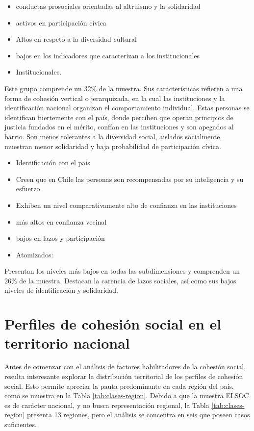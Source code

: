 \documentclass[
  12pt,
]{book}
\begin{document}
\begin{itemize}
\item
  conductas prosociales orientadas al altruismo y la solidaridad
\item
  activos en participación cívica
\item
  Altos en respeto a la diversidad cultural
\item
  bajos en los indicadores que caracterizan a los institucionales
\item
  Institucionales.
\end{itemize}

Este grupo comprende un 32\% de la muestra. Sus características refieren a una forma de cohesión vertical o jerarquizada, en la cual las instituciones y la identificación nacional organizan el comportamiento individual. Estas personas se identifican fuertemente con el país, donde perciben que operan principios de justicia fundados en el mérito, confían en las instituciones y son apegados al barrio. Son menos tolerantes a la diversidad social, aislados socialmente, muestran menor solidaridad y baja probabilidad de participación cívica.

\begin{itemize}
\item
  Identificación con el país
\item
  Creen que en Chile las personas son recompensadas por su inteligencia y su esfuerzo
\item
  Exhiben un nivel comparativamente alto de confianza en las instituciones
\item
  más altos en confianza vecinal
\item
  bajos en lazos y participación
\item
  Atomizados:
\end{itemize}

Presentan los niveles más bajos en todas las subdimensiones y comprenden un 26\% de la muestra. Destacan la carencia de lazos sociales, así como sus bajos niveles de identificación y solidaridad.

\hypertarget{perfiles-de-cohesiuxf3n-social-en-el-territorio-nacional}{%
\section{Perfiles de cohesión social en el territorio nacional}\label{perfiles-de-cohesiuxf3n-social-en-el-territorio-nacional}}

Antes de comenzar con el análisis de factores habilitadores de la cohesión social, resulta interesante explorar la distribución territorial de los perfiles de cohesión social. Esto permite apreciar la pauta predominante en cada región del país, como se muestra en la Tabla \ref{tab:clases-region}. Debido a que la muestra ELSOC es de carácter nacional, y no busca representación regional, la Tabla \ref{tab:clases-region} presenta 13 regiones, pero el análisis se concentra en seis que poseen casos suficientes.
\end{document}
